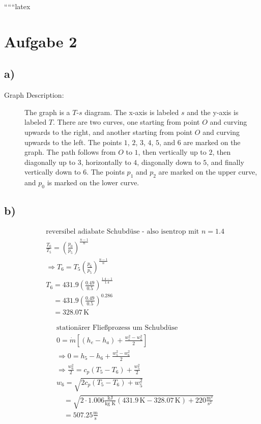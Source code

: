 
``````latex


\section*{Aufgabe 2}

\subsection*{a)}

\begin{description}
    \item[Graph Description:] The graph is a $T$-$s$ diagram. The x-axis is labeled $s$ and the y-axis is labeled $T$. There are two curves, one starting from point $O$ and curving upwards to the right, and another starting from point $O$ and curving upwards to the left. The points $1$, $2$, $3$, $4$, $5$, and $6$ are marked on the graph. The path follows from $O$ to $1$, then vertically up to $2$, then diagonally up to $3$, horizontally to $4$, diagonally down to $5$, and finally vertically down to $6$. The points $p_1$ and $p_2$ are marked on the upper curve, and $p_0$ is marked on the lower curve.
\end{description}

\subsection*{b)}

\begin{align*}
    &\text{reversibel adiabate Schubdüse - also isentrop mit } n = 1.4 \\
    &\frac{T_0}{T_5} = \left( \frac{p_0}{p_5} \right)^{\frac{n-1}{n}} \\
    &\Rightarrow T_6 = T_5 \left( \frac{p_6}{p_5} \right)^{\frac{n-1}{n}} \\
    &T_6 = 431.9 \left( \frac{0.49}{0.5} \right)^{\frac{1.4-1}{1.4}} \\
    &\quad = 431.9 \left( \frac{0.49}{0.5} \right)^{0.286} \\
    &\quad = 328.07 \, \text{K}
\end{align*}

\begin{align*}
    &\text{stationärer Fließprozess um Schubdüse} \\
    &0 = \dot{m} \left[ (h_e - h_a) + \frac{w_e^2 - w_a^2}{2} \right] \\
    &\Rightarrow 0 = h_5 - h_6 + \frac{w_5^2 - w_6^2}{2} \\
    &\Rightarrow \frac{w_6^2}{2} = c_p (T_5 - T_6) + \frac{w_5^2}{2} \\
    &w_6 = \sqrt{2 c_p (T_5 - T_6) + w_5^2} \\
    &\quad = \sqrt{2 \cdot 1.006 \frac{\text{kJ}}{\text{kg K}} (431.9 \, \text{K} - 328.07 \, \text{K}) + 220 \frac{\text{m}^2}{\text{s}^2}} \\
    &\quad = 507.25 \frac{\text{m}}{\text{s}}
\end{align*}

